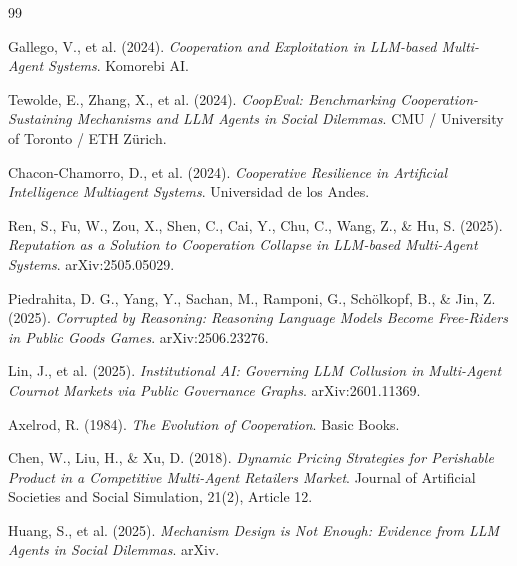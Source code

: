\documentclass{article}
\begin{document}

\begin{thebibliography}{99}

Gallego, V., et al. (2024).
\textit{Cooperation and Exploitation in LLM-based Multi-Agent Systems}.
Komorebi AI.


Tewolde, E., Zhang, X., et al. (2024).
\textit{CoopEval: Benchmarking Cooperation-Sustaining Mechanisms and LLM Agents in Social Dilemmas}.
CMU / University of Toronto / ETH Z\"{u}rich.

Chacon-Chamorro, D., et al. (2024).
\textit{Cooperative Resilience in Artificial Intelligence Multiagent Systems}.
Universidad de los Andes.

Ren, S., Fu, W., Zou, X., Shen, C., Cai, Y., Chu, C., Wang, Z., \& Hu, S. (2025).
\textit{Reputation as a Solution to Cooperation Collapse in LLM-based Multi-Agent Systems}.
arXiv:2505.05029.

Piedrahita, D. G., Yang, Y., Sachan, M., Ramponi, G., Sch\"{o}lkopf, B., \& Jin, Z. (2025).
\textit{Corrupted by Reasoning: Reasoning Language Models Become Free-Riders in Public Goods Games}.
arXiv:2506.23276.

Lin, J., et al. (2025).
\textit{Institutional AI: Governing LLM Collusion in Multi-Agent Cournot Markets via Public Governance Graphs}.
arXiv:2601.11369.

Axelrod, R. (1984).
\textit{The Evolution of Cooperation}.
Basic Books.

Chen, W., Liu, H., \& Xu, D. (2018).
\textit{Dynamic Pricing Strategies for Perishable Product in a Competitive Multi-Agent Retailers Market}.
Journal of Artificial Societies and Social Simulation, 21(2), Article 12.

Huang, S., et al. (2025).
\textit{Mechanism Design is Not Enough: Evidence from LLM Agents in Social Dilemmas}.
arXiv.

\end{thebibliography}

\appendix
\end{document}
